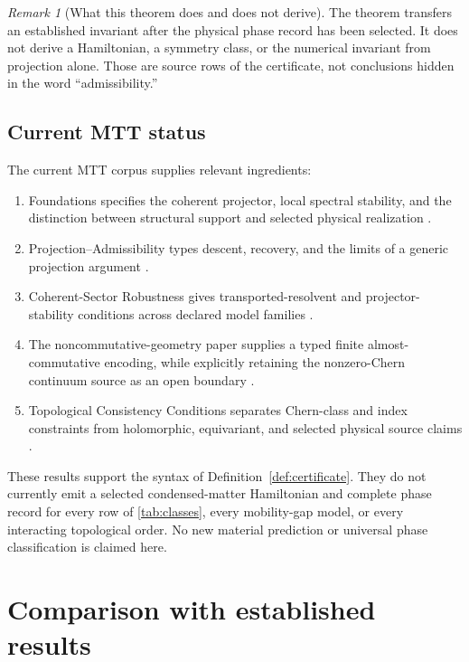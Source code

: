 \documentclass[11pt]{article}
\theoremstyle{definition}
\theoremstyle{remark}
\newtheorem{remark}[theorem]{Remark}
\begin{document}
\begin{remark}[What this theorem does and does not derive]
The theorem transfers an established invariant after the physical phase
record has been selected.  It does not derive a Hamiltonian, a symmetry
class, or the numerical invariant from projection alone.  Those are source
rows of the certificate, not conclusions hidden in the word
``admissibility.''
\end{remark}

\subsection{Current MTT status}

The current MTT corpus supplies relevant ingredients:
\begin{enumerate}
\item Foundations specifies the coherent projector, local spectral
  stability, and the distinction between structural support and selected
  physical realization \cite{NeroFoundation}.
\item Projection--Admissibility types descent, recovery, and the limits of a
  generic projection argument \cite{NeroProjection}.
\item Coherent-Sector Robustness gives transported-resolvent and
  projector-stability conditions across declared model families
  \cite{NeroRobustness}.
\item The noncommutative-geometry paper supplies a typed finite
  almost-commutative encoding, while explicitly retaining the
  nonzero-Chern continuum source as an open boundary \cite{NeroNCG}.
\item Topological Consistency Conditions separates Chern-class and index
  constraints from holomorphic, equivariant, and selected physical source
  claims \cite{NeroTopology}.
\end{enumerate}

These results support the syntax of Definition~\ref{def:certificate}.  They do not
currently emit a selected condensed-matter Hamiltonian and complete phase
record for every row of \cref{tab:classes}, every mobility-gap model, or
every interacting topological order.  No new material prediction or
universal phase classification is claimed here.

\section{Comparison with established results}
\end{document}
